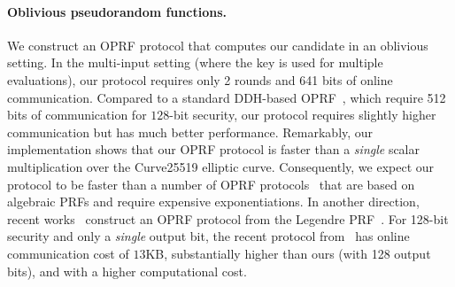 \paragraph{Oblivious pseudorandom functions.}
We construct an OPRF protocol that computes our \ttwPRF candidate in an oblivious setting. In the multi-input setting (where the key is used for multiple evaluations), our protocol requires only 2 rounds and 641 bits of online communication.
Compared to a standard DDH-based OPRF~\cite{jarecki2014-ddhoprf,jarecki2016-ddhoprf}, which require 512 bits of communication for $128$-bit security, our protocol requires slightly higher communication but has much better performance. Remarkably, our implementation shows that our OPRF protocol is faster than a \textit{single} scalar multiplication over the Curve25519 elliptic curve. Consequently, we expect our protocol to be faster than a number of OPRF protocols~\cite{freedman2005-oprf,jarecki2009-oprf} that are based on algebraic PRFs and require expensive exponentiations. In another direction, recent works~\cite{grassi2016-mpcfriendly,seres2021-legendre} construct an OPRF protocol from the Legendre PRF~\cite{damgard1988-legendre}. For 128-bit security and only a {\em single} output bit, the recent protocol from~\cite{seres2021-legendre} has online communication cost of $13$KB, substantially higher than ours (with 128 output bits), and with a higher computational cost.




